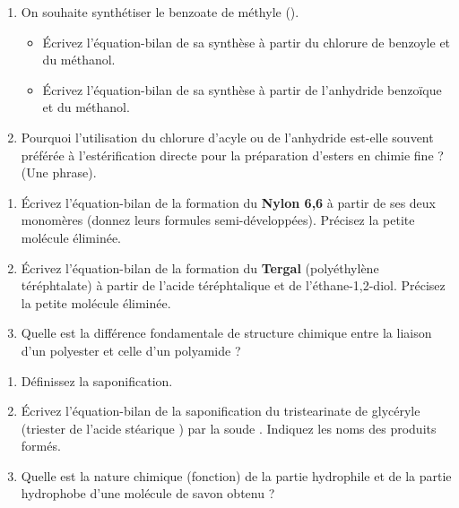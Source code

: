 \documentclass[11pt]{article}
\begin{document}
\begin{exercice}
\begin{enumerate}
    \item On souhaite synthétiser le benzoate de méthyle (). 
    \begin{itemize}
        \item Écrivez l'équation-bilan de sa synthèse à partir du chlorure de benzoyle et du méthanol.
        \item Écrivez l'équation-bilan de sa synthèse à partir de l'anhydride benzoïque et du méthanol.
    \end{itemize}
    \item Pourquoi l'utilisation du chlorure d'acyle ou de l'anhydride est-elle souvent préférée à l'estérification directe pour la préparation d'esters en chimie fine ? (Une phrase).
\end{enumerate}
\end{exercice}

\begin{exercice}
\begin{enumerate}
    \item Écrivez l'équation-bilan de la formation du \textbf{Nylon 6,6} à partir de ses deux monomères (donnez leurs formules semi-développées). Précisez la petite molécule éliminée.
    \item Écrivez l'équation-bilan de la formation du \textbf{Tergal} (polyéthylène téréphtalate) à partir de l'acide téréphtalique et de l'éthane-1,2-diol. Précisez la petite molécule éliminée.
    \item Quelle est la différence fondamentale de structure chimique entre la liaison d'un polyester et celle d'un polyamide ?
\end{enumerate}
\end{exercice}

\begin{exercice}
\begin{enumerate}
    \item Définissez la saponification.
    \item Écrivez l'équation-bilan de la saponification du tristearinate de glycéryle (triester de l'acide stéarique ) par la soude . Indiquez les noms des produits formés.
    \item Quelle est la nature chimique (fonction) de la partie hydrophile et de la partie hydrophobe d'une molécule de savon obtenu ?
\end{enumerate}
\end{exercice}
\end{document}
